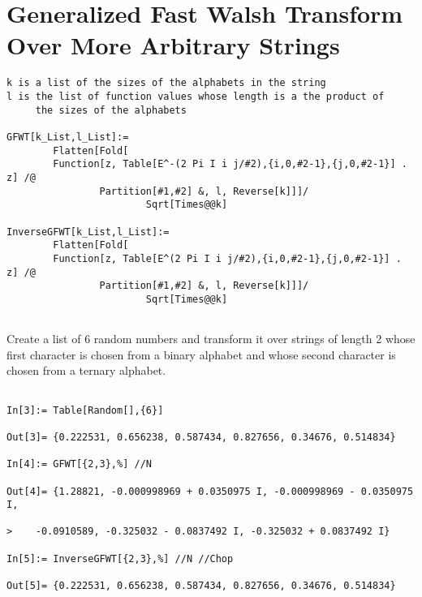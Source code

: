 \section{Generalized Fast Walsh Transform Over More Arbitrary Strings}
\begin{verbatim}
k is a list of the sizes of the alphabets in the string
l is the list of function values whose length is a the product of 
     the sizes of the alphabets

GFWT[k_List,l_List]:=
        Flatten[Fold[
        Function[z, Table[E^-(2 Pi I i j/#2),{i,0,#2-1},{j,0,#2-1}] . z] /@
                Partition[#1,#2] &, l, Reverse[k]]]/
                        Sqrt[Times@@k]

InverseGFWT[k_List,l_List]:=
        Flatten[Fold[
        Function[z, Table[E^(2 Pi I i j/#2),{i,0,#2-1},{j,0,#2-1}] . z] /@
                Partition[#1,#2] &, l, Reverse[k]]]/
               	        Sqrt[Times@@k]


\end{verbatim}
\begin{example}
Create a list of 6 random numbers and transform it over strings of
length 2 whose first character is chosen from a binary alphabet and
whose second character is chosen from a ternary alphabet.
\end{example}
\begin{verbatim}

In[3]:= Table[Random[],{6}]

Out[3]= {0.222531, 0.656238, 0.587434, 0.827656, 0.34676, 0.514834}

In[4]:= GFWT[{2,3},%] //N

Out[4]= {1.28821, -0.000998969 + 0.0350975 I, -0.000998969 - 0.0350975 I, 
 
>    -0.0910589, -0.325032 - 0.0837492 I, -0.325032 + 0.0837492 I}

In[5]:= InverseGFWT[{2,3},%] //N //Chop

Out[5]= {0.222531, 0.656238, 0.587434, 0.827656, 0.34676, 0.514834}

\end{verbatim}
